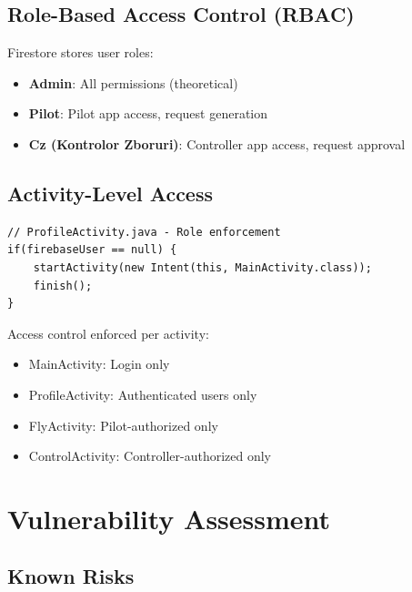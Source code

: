 \documentclass[11pt,a4paper]{report}
\begin{document}
\subsection{Role-Based Access Control (RBAC)}

Firestore stores user roles:
\begin{itemize}
    \item \textbf{Admin}: All permissions (theoretical)
    \item \textbf{Pilot}: Pilot app access, request generation
    \item \textbf{Cz (Kontrolor Zboruri)}: Controller app access, request approval
\end{itemize}

\subsection{Activity-Level Access}

\begin{lstlisting}
// ProfileActivity.java - Role enforcement
if(firebaseUser == null) {
    startActivity(new Intent(this, MainActivity.class));
    finish();
}
\end{lstlisting}

Access control enforced per activity:
\begin{itemize}
    \item MainActivity: Login only
    \item ProfileActivity: Authenticated users only
    \item FlyActivity: Pilot-authorized only
    \item ControlActivity: Controller-authorized only
\end{itemize}

\section{Vulnerability Assessment}

\subsection{Known Risks}
\end{document}
